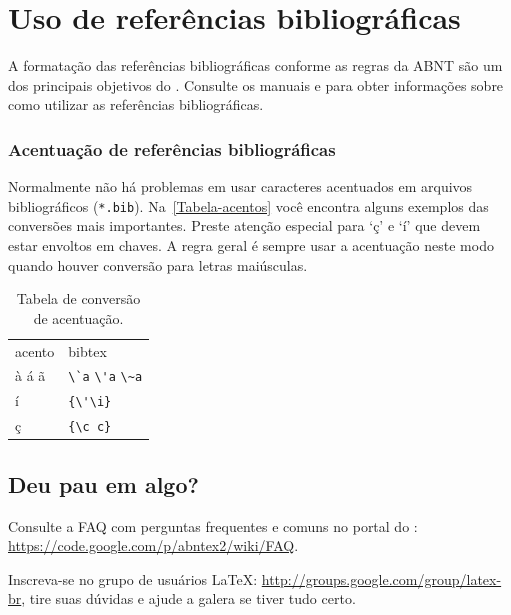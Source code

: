 \chapter{Uso de referências bibliográficas}

A formatação das referências bibliográficas conforme as regras da ABNT são um
dos principais objetivos do \abnTeX. Consulte os manuais
 e  para obter informações
sobre como utilizar as referências bibliográficas.

\subsection{Acentuação de referências bibliográficas}

Normalmente não há problemas em usar caracteres acentuados em arquivos
bibliográficos (\texttt{*.bib}). Na~\autoref{Tabela-acentos} você encontra alguns exemplos das conversões mais importantes. Preste atenção especial para `ç' e `í'
que devem estar envoltos em chaves. A regra geral é sempre usar a acentuação
neste modo quando houver conversão para letras maiúsculas.

\begin{table}[htbp]
\caption{Tabela de conversão de acentuação.}
\label{Tabela-acentos}

\begin{center}
\begin{tabular}{ll}\hline\hline
acento & \textsf{bibtex}\\
à á ã & \verb+\`a+ \verb+\'a+ \verb+\~a+\\
í & \verb+{\'\i}+\\
ç & \verb+{\c c}+\\
\hline\hline
\end{tabular}
\end{center}
\end{table}


\section{Deu pau em algo?}

Consulte a FAQ com perguntas frequentes e comuns no portal do \abnTeX:
\url{https://code.google.com/p/abntex2/wiki/FAQ}.

Inscreva-se no grupo de usuários \LaTeX:
\url{http://groups.google.com/group/latex-br}, tire suas dúvidas e ajude a galera se tiver tudo certo.


